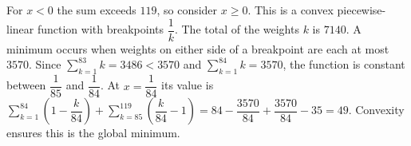 For $x<0$ the sum exceeds $119$, so consider $x\ge0$. This is a convex piecewise-linear function with breakpoints $\dfrac{1}{k}$. The total of the weights $k$ is $7140$. A minimum occurs when weights on either side of a breakpoint are each at most $3570$. Since $\sum_{k=1}^{83}k=3486<3570$ and $\sum_{k=1}^{84}k=3570$, the function is constant between $\dfrac{1}{85}$ and $\dfrac{1}{84}$. At $x = \dfrac{1}{84}$ its value is $\sum_{k=1}^{84} (1 - \dfrac{k}{84}) + \sum_{k=85}^{119} (\dfrac{k}{84} - 1) = 84 - \dfrac{3570}{84} + \dfrac{3570}{84} - 35 = \boxed{49}$. Convexity ensures this is the global minimum.
